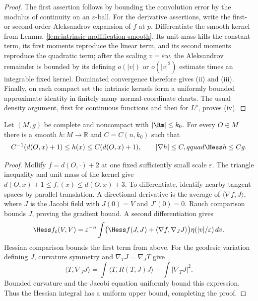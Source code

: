 \begin{proof}
\sketch
{}
The first assertion follows by bounding the convolution error by the modulus
of continuity on an $\varepsilon$-ball.  For the derivative assertions, write
the first- or second-order Aleksandrov expansion of $f$ at $p$.  Differentiate
the smooth kernel from Lemma~\ref{lem:intrinsic-mollification-smooth}.  Its
unit mass kills the constant term, its first moments reproduce the linear
term, and its second moments reproduce the quadratic term; after the scaling
$v=\varepsilon w$, the Aleksandrov remainder is bounded by its defining
$o(|v|)$ or $o(|v|^2)$ estimate times an integrable fixed kernel.  Dominated
convergence therefore gives (ii) and (iii).  Finally, on each compact set the
intrinsic kernels form a uniformly bounded approximate identity in finitely
many normal-coordinate charts.  The usual density argument, first for
continuous functions and then for $L^p$, proves (iv).
\end{proof}

\begin{lemma}
\label{lem:bounded-curvature-distance-like-function}
Let $(M,g)$ be complete and noncompact with $|\Rm|\leq k_0$.  For every
$O\in M$ there is a smooth $h:M\to\mathbb R$ and $C=C(n,k_0)$ such that
\[
C^{-1}(d(O,x)+1)\leq h(x)\leq C(d(O,x)+1),
\qquad |\nabla h|\leq C,qquad \Hess h\leq Cg.
\]
\end{lemma}

\begin{proof}
\sketch
{}
Mollify $f=d(O,\cdot)+2$ at one fixed sufficiently small scale
$\varepsilon$.  The triangle inequality and unit mass of the kernel give
$d(O,x)+1\leq f_\varepsilon(x)\leq d(O,x)+3$.  To differentiate, identify
nearby tangent spaces by parallel translation.  A directional derivative is
the average of $\langle\nabla f,J\rangle$, where $J$ is the Jacobi field with
$J(0)=V$ and $J'(0)=0$.  Rauch comparison bounds $J$, proving the gradient
bound.  A second differentiation gives
\[
\Hess f_\varepsilon(V,V)=\varepsilon^{-n}\int
\bigl(\Hess f(J,J)+\langle\nabla f,\nabla_JJ\rangle\bigr)
\eta(|v|/\varepsilon)\,dv.
\]
Hessian comparison bounds the first term from above.  For the geodesic
variation defining $J$, curvature symmetry and $\nabla_TJ=\nabla_JT$ give
\[
\langle T,\nabla_JJ\rangle
=\int\langle T,R(T,J)J\rangle-\int|\nabla_TJ|^2.
\]
Bounded curvature and the Jacobi equation uniformly bound this expression.
Thus the Hessian integral has a uniform upper bound, completing the proof.
\end{proof}
